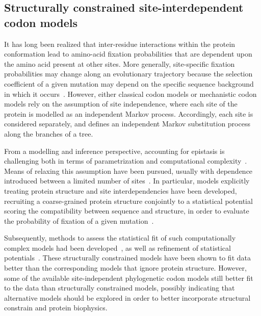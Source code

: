 \subsection{Structurally constrained site-interdependent codon models}
\label{subsec:structurally-constrained-site-interdependent-codon-models}

It has long been realized that inter-residue interactions within the protein conformation lead to amino-acid fixation probabilities that are dependent upon the amino acid present at other sites.
More generally, site-specific fixation probabilities may change along an evolutionary trajectory because the selection coefficient of a given mutation may depend on the specific sequence background in which it occurs~\citep{Goldstein2016}.
However, either classical codon models or mechanistic codon models rely on the assumption of site independence, where each site of the protein is modelled as an independent Markov process.
Accordingly, each site is considered separately, and defines an independent Markov substitution process along the branches of a tree.

From a modelling and inference perspective, accounting for epistasis is challenging both in terms of parametrization and computational complexity~\citep{Manhart2014}.
Means of relaxing this assumption have been pursued, usually with dependence introduced between a limited number of sites~\citep{Felsenstein1996}.
In particular, models explicitly treating protein structure and site interdependencies have been developed, recruiting a coarse-grained protein structure conjointly to a statistical potential scoring the compatibility between sequence and structure, in order to evaluate the probability of fixation of a given mutation~\citep{Robinson2003, Rodrigue2005}.

Subsequently, methods to assess the statistical fit of such computationally complex models had been developed~\citep{Rodrigue2009}, as well as refinement of statistical potentials~\citep{Kleinman2010}.
These structurally constrained models have been shown to fit data better than the corresponding models that ignore protein structure.
However, some of the available site-independent phylogenetic codon models still better fit to the data than structurally constrained models, possibly indicating that alternative models should be explored in order to better incorporate structural constrain and protein biophysics.

